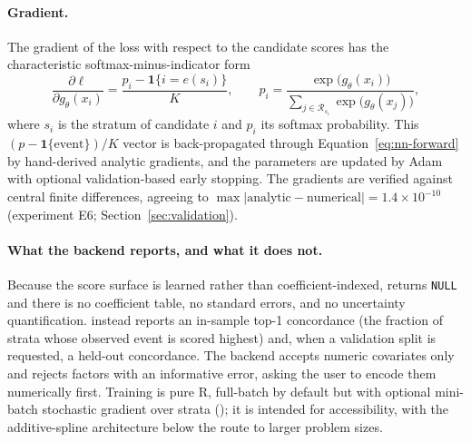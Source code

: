 \paragraph{Gradient.}
The gradient of the loss with respect to the candidate scores has the
characteristic softmax-minus-indicator form
\begin{equation}
  \label{eq:nn-grad}
  \frac{\partial \ell}{\partial g_\theta(x_i)}
  = \frac{p_i - \mathbf{1}\{i = e(s_i)\}}{K},
  \qquad
  p_i = \frac{\exp\!\big(g_\theta(x_i)\big)}
             {\sum_{j \in \mathcal{R}_{s_i}} \exp\!\big(g_\theta(x_j)\big)},
\end{equation}
where $s_i$ is the stratum of candidate $i$ and $p_i$ its softmax probability.
This $(p - \mathbf{1}\{\text{event}\})/K$ vector is back-propagated through
Equation~\eqref{eq:nn-forward} by hand-derived analytic gradients, and the
parameters are updated by Adam with optional validation-based early stopping.
The gradients are verified against central finite differences, agreeing to
$\max|\text{analytic} - \text{numerical}| = 1.4\times 10^{-10}$ (experiment E6;
Section~\ref{sec:validation}).

\paragraph{What the backend reports, and what it does not.}
Because the score surface is learned rather than coefficient-indexed,
 returns \texttt{NULL} and there is no coefficient table, no
standard errors, and no uncertainty quantification.  instead
reports an in-sample top-1 concordance (the fraction of strata whose observed
event is scored highest) and, when a validation split is requested, a held-out
concordance. The backend accepts numeric covariates only and rejects factors
with an informative error, asking the user to encode them numerically first.
Training is pure R, full-batch by default but with optional mini-batch
stochastic gradient over strata (); it is intended for
accessibility, with the additive-spline architecture below the route to
larger problem sizes.

